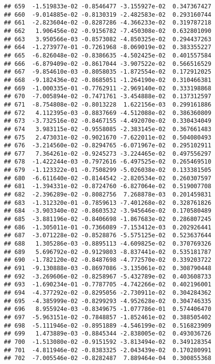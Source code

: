 \documentclass[
]{article}
\begin{document}
\begin{verbatim}
## 659  -1.519833e-02 -0.8546477 -3.155927e-02  0.347367427
## 660  -9.014885e-02 -0.8130319 -2.482583e-02  0.293160744
## 661  -2.823604e-02 -0.8287286 -4.366233e-02  0.319787218
## 662   1.906456e-02 -0.9156782 -7.450308e-02  0.632801090
## 663   3.950566e-03 -0.8573082 -4.850325e-02  0.294437263
## 664  -1.273977e-01 -0.7261968 -8.069019e-02  0.383355227
## 665  -6.826048e-02 -0.8386635 -4.502425e-02  0.401557584
## 666  -6.879409e-02 -0.8617044 -3.907522e-02  0.566516529
## 667  -9.854610e-03 -0.8058035 -1.872554e-02  0.172912025
## 668  -9.182436e-02 -0.8685051 -1.264190e-02  0.310466381
## 669  -1.000335e-01 -0.7762911 -2.969140e-02  0.333198868
## 670  -7.005894e-02 -0.7471761 -3.454888e-02  0.137312597
## 671  -8.754808e-02 -0.8013228  1.622156e-03  0.299161886
## 672   4.112395e-03 -0.8837669 -4.512088e-02  0.386360809
## 673  -3.732516e-02 -0.8467155 -4.492070e-02  0.330434049
## 674   3.983115e-02 -0.9558085 -2.383145e-02  0.367661483
## 675   2.473031e-02 -0.9021670 -7.622011e-02  0.504080493
## 676  -3.214560e-02 -0.8294765 -6.071967e-02  0.295102911
## 677   7.364261e-02 -0.9245273 -3.224465e-02  0.497556297
## 678  -1.422244e-03 -0.7972616 -6.497525e-02  0.265469510
## 679  -1.123322e-01 -0.7508299 -5.026038e-02  0.133381505
## 680  -6.611640e-02 -0.8144542 -2.820534e-02  0.260307597
## 681  -1.394331e-02 -0.8724760 -6.827064e-02  0.519007708
## 682  -2.396289e-02 -0.8082756  7.268878e-03  0.201459831
## 683  -1.312320e-01 -0.7859613 -7.401268e-02  0.328761826
## 684  -3.903340e-02 -0.8603532 -3.945646e-02  0.170580489
## 685  -3.881196e-02 -0.8406698 -1.867683e-02  0.286807245
## 686  -1.305011e-01 -0.7366089 -7.153412e-03  0.202926441
## 687  -3.071228e-02 -0.8528876 -5.575125e-02  0.523637644
## 688   1.305286e-03 -0.8895113 -4.609825e-02  0.370769326
## 689   5.696792e-02 -0.9129803 -8.837441e-02  0.535181787
## 690  -1.782120e-02 -0.8487698 -4.772570e-02  0.339203722
## 691  -9.130888e-03 -0.8697086 -3.135061e-02  0.308790448
## 692  -3.269606e-02 -0.8258967 -5.432789e-02  0.403608733
## 693  -1.690234e-01 -0.7787705 -4.742266e-02  0.402196001
## 694  -4.377292e-02 -0.8295056 -2.730911e-02  0.304284362
## 695  -4.385999e-02 -0.8299293 -4.952628e-02  0.304746335
## 696   8.955924e-03 -0.8349675 -1.077786e-01  0.574406470
## 697  -5.963151e-02 -0.7848857 -1.852461e-02  0.388505402
## 698  -5.111946e-02 -0.8951889 -4.546199e-02  0.516823909
## 699   1.473889e-03 -0.8845344 -2.838005e-02  0.493036726
## 700  -1.513080e-02 -0.9151592 -3.813494e-02  0.349128354
## 701  -4.811946e-02 -0.8383325 -2.043439e-02  0.170280991
## 702  -7.005546e-02 -0.8282487  7.889464e-04  0.300855368

\end{verbatim}
\end{document}
